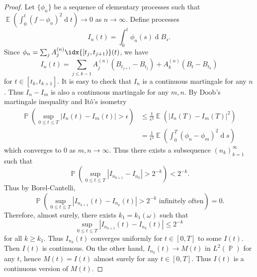 \documentclass[11pt, a4paper]{memoir}
\theoremstyle{change}
\theoremstyle{plain}
\theoremstyle{nonumberplain}
\newtheorem{proof}{Proof}
\DeclareMathOperator{\pr}{{\mathbb{P}}}
\DeclareMathOperator{\E}{{\mathbb{E}}}
\renewcommand{\d}[1]{\ensuremath{\operatorname{d}\!{#1}}}
\numberwithin{equation}{section}
\begin{document}
\begin{proof}
    Let $\{\phi_n\}$ be a sequence of elementary processes such that $\E(\int_0^t(f-\phi_n)^2\d{t})\to 0$ as $n\to\infty$.
    Define processes
    \begin{equation*}
        I_n(t)=\int_0^t\phi_n(s)\d{B_s}.
    \end{equation*}
    Since $\phi_n=\sum_j A_j^{(n)}\idx{[t_j,t_{j+1})}(t)$, we have
    \begin{equation*}
        I_n(t)=\sum_{j\leq k-1}A_j^{(n)}(B_{t_{j+1}}-B_{t_j})+A_k^{(n)}(B_t-B_{t_k})
    \end{equation*}
    for $t\in[t_k,t_{k+1}]$.
    It is easy to check that $I_n$ is a continuous martingale for any $n$.
    Thus $I_n-I_m$ is also a continuous martingale for any $m,n$.
    By Doob's martingale inequality and Itô's isometry
    \begin{align*}
        \pr(\sup_{0\leq t\leq T}|I_n(t)-I_m(t)|>\epsilon) &\leq\frac{1}{\epsilon^2}\E(|I_n(T)-I_m(T)|^2)\\
                                                          &= \frac{1}{\epsilon^2}\E(\int_0^T(\phi_n-\phi_m)^2\d{s})
    \end{align*}
    which converges to $0$ as $m,n\to\infty$.
    Thus there exists a subsequence $(n_k)_{k=1}^\infty$ such that
    \begin{equation*}
        \pr(\sup_{0\leq t\leq T}|I_{n_{k+1}}-I_{n_k}|>2^{-k})<2^{-k}.
    \end{equation*}
    Thus by Borel-Cantelli,
    \begin{equation*}
        \pr(\sup_{0\leq t\leq T}|I_{n_{k+1}}(t)-I_{n_k}(t)|>2^{-k}\text{ infinitely often})=0.
    \end{equation*}
    Therefore, almost surely, there exists $k_1=k_1(\omega)$ such that
    \begin{equation*}
        \sup_{0\leq t\leq T}|I_{n_{k+1}}(t)-I_{n_k}(t)|\leq 2^{-k}
    \end{equation*}
    for all $k\geq k_1$.
    Thus $I_{n_k}(t)$ converges uniformly for $t\in[0,T]$ to some $I(t)$.
    Then $I(t)$ is continuous.
    On the other hand, $I_{n_k}(t)\to M(t)$ in $L^2(\pr)$ for any $t$, hence $M(t)=I(t)$ almost surely for any $t\in[0,T]$.
    Thus $I(t)$ is a continuous version of $M(t)$.


\end{proof}
\end{document}

